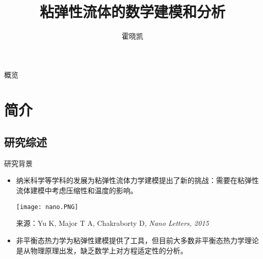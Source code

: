 \documentclass[mathserif]{beamer}
\title[粘弹性流体建模与分析]{粘弹性流体的数学建模和分析}
\author{霍晓凯}
\institute[清华]{博士论文最终学术报告}
\begin{document}
\begin{frame}
  \maketitle
\end{frame}
\begin{frame}{概览}
  \tableofcontents
\end{frame}





\section{简介}
\subsection{研究综述}
\begin{frame}{研究背景}
\begin{itemize}
	\item<1-> 纳米科学等学科的发展为粘弹性流体力学建模提出了新的挑战：需要在粘弹性流体建模中考虑压缩性和温度的影响。
	\begin{center}
   	\texttt{[image: nano.PNG]}
	\end{center}
  {\tiny 来源：Yu K, Major T A, Chakraborty D, \emph{Nano Letters, 2015}}
	\item<2-> 非平衡态热力学为粘弹性建模提供了工具，但目前大多数非平衡态热力学理论是从物理原理出发，缺乏数学上对方程适定性的分析。
\end{itemize}
\end{frame}
\end{document}
